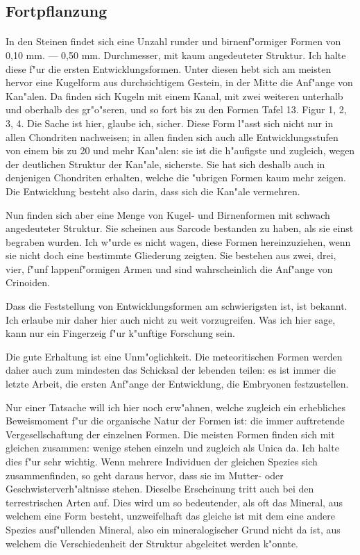 \documentclass[a4paper, 11pt, oneside]{article}
\begin{document}
\subsection{Fortpflanzung}
\paragraph{}
In den Steinen findet sich eine Unzahl runder und birnenf"ormiger Formen von 0,10 mm. --- 0,50 mm. Durchmesser, mit kaum angedeuteter Struktur. Ich halte diese f"ur die ersten Entwicklungsformen. Unter diesen hebt sich am meisten hervor eine Kugelform aus durchsichtigem Gestein, in der Mitte die Anf"ange von Kan"alen. Da finden sich Kugeln mit einem Kanal, mit zwei weiteren unterhalb und oberhalb des gr"o"seren, und so fort bis zu den Formen Tafel 13. Figur 1, 2, 3, 4. Die Sache ist hier, glaube ich, sicher. Diese Form l"asst sich nicht nur in allen Chondriten nachweisen; in allen finden sich auch alle Entwicklungsstufen von einem bis zu 20 und mehr Kan"alen: sie ist die h"aufigste und zugleich, wegen der deutlichen Struktur der Kan"ale, sicherste. Sie hat sich deshalb auch in denjenigen Chondriten erhalten, welche die "ubrigen Formen kaum mehr zeigen. Die Entwicklung besteht also darin, dass sich die Kan"ale vermehren.

Nun finden sich aber eine Menge von Kugel- und Birnenformen mit schwach angedeuteter Struktur. Sie scheinen aus Sarcode bestanden zu haben, als sie einst begraben wurden. Ich w"urde es nicht wagen, diese Formen hereinzuziehen, wenn sie nicht doch eine bestimmte Gliederung zeigten. Sie bestehen aus zwei, drei, vier, f"unf lappenf"ormigen Armen und sind wahrscheinlich die Anf"ange von Crinoiden.

Dass die Feststellung von Entwicklungsformen am schwierigsten ist, ist bekannt. Ich erlaube mir daher hier auch nicht zu weit vorzugreifen. Was ich hier sage, kann nur ein Fingerzeig f"ur k"unftige Forschung sein.

Die gute Erhaltung ist eine Unm"oglichkeit. Die meteoritischen Formen werden daher auch zum mindesten das Schicksal der lebenden teilen: es ist immer die letzte Arbeit, die ersten Anf"ange der Entwicklung, die Embryonen festzustellen.

Nur einer Tatsache will ich hier noch erw"ahnen, welche zugleich ein erhebliches Beweismoment f"ur die organische Natur der Formen ist: die immer auftretende Vergesellschaftung der einzelnen Formen. Die meisten Formen finden sich mit gleichen zusammen: wenige stehen einzeln und zugleich als Unica da. Ich halte dies f"ur sehr wichtig. Wenn mehrere Individuen der gleichen Spezies sich zusammenfinden, so geht daraus hervor, dass sie im Mutter- oder Geschwisterverh"altnisse stehen. Dieselbe Erscheinung tritt auch bei den terrestrischen Arten auf. Dies wird um so bedeutender, als oft das Mineral, aus welchem eine Form besteht, unzweifelhaft das gleiche ist mit dem eine andere Spezies ausf"ullenden Mineral, also ein mineralogischer Grund nicht da ist, aus welchem die Verschiedenheit der Struktur abgeleitet werden k"onnte.
\clearpage
\end{document}
